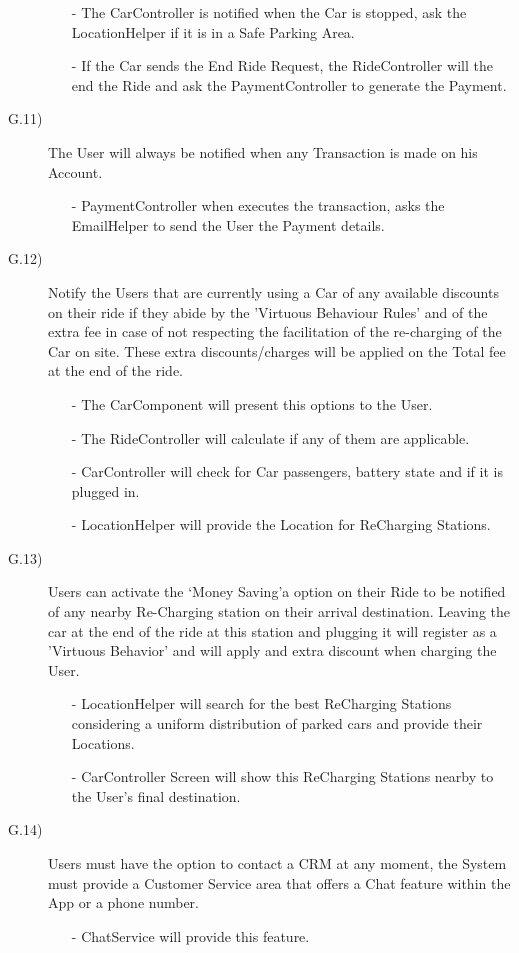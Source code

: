 \documentclass[a4paper]{article}
\begin{document}
\begin{description}
\begin{itemize}
	\item[-]The CarController is notified when the Car is stopped, ask the LocationHelper if it is in a Safe Parking Area.
	\item[-]If the Car sends the End Ride Request, the RideController will the end the Ride and ask the PaymentController to generate the Payment.
\end{itemize}
\item [G.11)]The User will always be notified when any Transaction is made on his Account.
\begin{itemize}
	\item[-]PaymentController when executes the transaction, asks the EmailHelper to send the User the Payment details.
\end{itemize}
\newpage
\item [G.12)]Notify the Users that are currently using a Car of any available discounts on their ride if they abide by the 'Virtuous Behaviour Rules' and of the extra fee in case of not respecting the facilitation of the re-charging of the Car on site. These extra discounts/charges will be applied on the Total fee at the end of the ride.
\begin{itemize}
	\item[-]The CarComponent will present this options to the User.
	\item[-]The RideController will calculate if any of them are applicable.
	\item[-]CarController will check for Car passengers, battery state and if it is plugged in.
	\item[-]LocationHelper will provide the Location for ReCharging Stations.
\end{itemize}

\item [G.13)]Users can activate the `Money Saving'a option on their Ride to be notified of any nearby Re-Charging station on their arrival destination. Leaving the car at the end of the ride at this station and plugging it will register as a 'Virtuous Behavior' and will apply and extra discount when charging the User.
\begin{itemize}
	\item[-]LocationHelper will search for the best ReCharging Stations considering a uniform distribution of parked cars and provide their Locations.
	\item[-]CarController Screen will show this ReCharging Stations nearby to the User's final destination.
\end{itemize}
\item [G.14)]Users must have the option to contact a CRM at any moment, the System must provide a Customer Service area that offers a Chat feature within the App or a phone number.
\begin{itemize}
	\item[-]ChatService will provide this feature.
\end{itemize}
\end{description}
\end{document}
